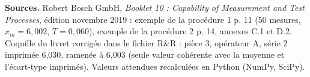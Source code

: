 \documentclass[10pt,a4paper]{article}
\begin{document}
\vspace{4pt}
{\footnotesize\color{uimm}\textbf{Sources.} Robert Bosch GmbH, \emph{Booklet 10 : Capability of Measurement and Test Processes}, édition novembre 2019 : exemple de la procédure 1 p. 11 (50 mesures, $x_m = 6{,}002$, $T = 0{,}060$), exemple de la procédure 2 p. 14, annexes C.1 et D.2. Coquille du livret corrigée dans le fichier R\&R : pièce 3, opérateur A, série 2 imprimée 6,030, ramenée à 6,003 (seule valeur cohérente avec la moyenne et l'écart-type imprimés). Valeurs attendues recalculées en Python (NumPy, SciPy).}
\end{document}
